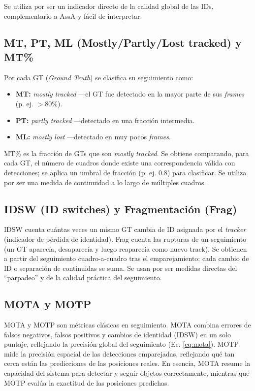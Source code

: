 Se utiliza por ser un indicador directo de la calidad global de las IDs, complementario a AssA y fácil de interpretar.

\subsection{MT, PT, ML (Mostly/Partly/Lost tracked) y MT\%}
Por cada GT (\textit{Ground Truth}) se clasifica su seguimiento como:
\begin{itemize}
  \item \textbf{MT:} \textit{mostly tracked} ---el GT fue detectado en la mayor parte de sus \textit{frames} (p. ej. $>80\%$).
  \item \textbf{PT:} \textit{partly tracked} ---detectado en una fracción intermedia.
  \item \textbf{ML:} \textit{mostly lost} ---detectado en muy pocos \textit{frames}.
\end{itemize}

MT\% es la fracción de GTs que son \textit{mostly tracked}. Se obtiene comparando, para cada GT, el número de cuadros donde existe una correspondencia válida con detecciones; se aplica un umbral de fracción (p. ej. 0.8) para clasificar. Se utiliza por ser una medida de continuidad a lo largo de múltiples cuadros.

\subsection{IDSW (ID switches) y Fragmentación (Frag)}
IDSW cuenta cuántas veces un mismo GT cambia de ID asignada por el \textit{tracker} (indicador de pérdida de identidad). Frag cuenta las rupturas de un seguimiento (un GT aparecía, desaparecía y luego reaparecía como nuevo track). Se obtienen a partir del seguimiento cuadro-a-cuadro tras el emparejamiento; cada cambio de ID o separación de continuidas se suma. Se usan por ser medidas directas del ``parpadeo'' y de la calidad práctica del seguimiento.

\subsection{MOTA y MOTP}
MOTA y MOTP son métricas clásicas en seguimiento. MOTA combina errores de falsos negativos, falsos positivos y cambios de identidad (IDSW) en un solo puntaje, reflejando la precisión global del seguimiento (Ec. \ref{eq:mota}). MOTP mide la precisión espacial de las detecciones emparejadas, reflejando qué tan cerca están las predicciones de las posiciones reales. En esencia, MOTA resume la capacidad del sistema para detectar y seguir objetos correctamente, mientras que MOTP evalúa la exactitud de las posiciones predichas.

